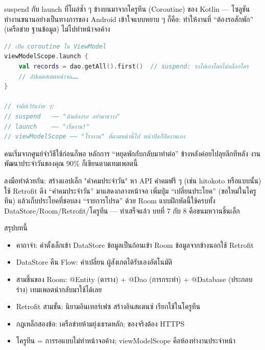 suspend กับ launch ที่โผล่ซ้ำ ๆ ข้างบนมาจากโครูทีน (Coroutine) ของ Kotlin — โซลูชันทำงานขนานอย่างเป็นทางการของ Android เข้าใจแบบหยาบ ๆ ก็คือ: ทำให้งานที่ “ต้องรอสักพัก” (เครือข่าย ฐานข้อมูล) ไม่ไปทำหน้าจอค้าง

\begin{lstlisting}[language=Kotlin]
// เปิด coroutine ใน ViewModel
viewModelScope.launch {
    val records = dao.getAll().first()  // suspend: รอได้เองโดยไม่บล็อกใคร
    // อัปเดตสเตตหน้าจอ……
}

// จำคีย์เวิร์ดง่าย ๆ:
// suspend   —— "ฉันต้องรอ อย่ามาขวาง"
// launch    —— "เริ่มงาน!"
// viewModelScope —— "โรงงาน" ที่ตามหน้านี้ไป หน้าปิดก็ปิดงานเอง
\end{lstlisting}

คนเริ่มจากศูนย์จำวิธีใช้ก่อนก็พอ หลักการ “หยุดพักกับกลับมาทำต่อ” ข้างหลังค่อยไปลุยลึกทีหลัง งานพัฒนาประจำวันของคุณ 90\% ก็เขียนตามเทมเพลตนี้

\begin{tcbpractice}{ลงมือทำด้วยกัน: สร้างแอปเล็ก "คำคมประจำวัน"}
หา API คำคมฟรี ๆ (เช่น hitokoto หรือแบบนั้น) ใช้ Retrofit ดึง “คำคมประจำวัน” มาแสดงกลางหน้าจอ เพิ่มปุ่ม “เปลี่ยนประโยค” (ขอใหม่ในโครูทีน) แล้วเก็บประโยคที่ชอบลง “รายการโปรด” ด้วย Room แบบฝึกหัดนี้ใช้ครบทั้ง DataStore/Room/Retrofit/โครูทีน — ทำเสร็จแล้ว บทที่ 7 กับ 8 คือขนมหวานชิ้นเล็ก

\end{tcbpractice}

\begin{tcbsummary}{สรุปบทนี้}
\begin{itemize}
  \item คาถาจำ: ค่าตั้งเล็กเข้า DataStore ข้อมูลเป็นก้อนเข้า Room ข้อมูลจากข้างนอกใช้ Retrofit
  \item DataStore คืน Flow: ค่าเปลี่ยน ผู้สังเกตได้รับเองอัตโนมัติ
  \item สามชิ้นของ Room: @Entity (ตาราง) + @Dao (การกระทำ) + @Database (ประกอบร่าง) เทมเพลตนำกลับมาใช้ได้เลย
  \item Retrofit สามขั้น: นิยามอินเทอร์เฟซ สร้างอินสแตนซ์ เรียกใช้ในโครูทีน
  \item กฎเหล็กสองข้อ: เครือข่ายห้ามยุ่งเธรดหลัก; ของจริงต้อง HTTPS
  \item โครูทีน = การรอแบบไม่ทำหน้าจอค้าง; viewModelScope คือห้องทำงานประจำหน้า
\end{itemize}

\end{tcbsummary}
